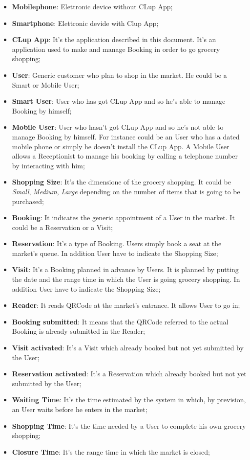 \begin{itemize}

\item \textbf{Mobilephone}: Elettronic device without CLup App;
\item \textbf{Smartphone}: Elettronic devide with Clup App; 
\item \textbf{CLup App}: It's the application described in this document. It's an application used to make and manage Booking in order to go grocery shopping;
\item \textbf{User}: Generic customer who plan to shop in the market. He could be a Smart or Mobile User;
\item \textbf{Smart User}: User who has got CLup App and so he's able to manage Booking by himself;
\item \textbf{Mobile User}: User who hasn't got CLup App and so he's not able to manage Booking by himself. For instance could be an User who has a dated mobile phone or simply he doesn't install the CLup App. A Mobile User allows a Receptionist to manage his booking by calling a telephone number by interacting with him;
\item \textbf{Shopping Size}: It's the dimensione of the grocery shopping. It could be \textit{Small}, \textit{Medium}, \textit{Large} depending on the number of items that is going to be purchased;  %
\item \textbf{Booking}: It indicates the generic appointment of a User in the market. It could be a Reservation or a Visit;
\item \textbf{Reservation}: It's a type of Booking. Users simply book a seat at the market's queue. In addition User have to indicate the Shopping Size; 
\item \textbf{Visit}: It's a Booking planned in advance by Users. It is planned by putting the date and the range time in which the User is going grocery shopping. In addition User have to indicate the Shopping Size; 
\item \textbf{Reader}: It reads QRCode at the market's entrance. It allows User to go in;
\item \textbf{Booking submitted}: It means that the QRCode referred to the actual Booking is already submitted in the Reader;
\item \textbf{Visit activated}: It's a Visit which already booked but not yet submitted by the User;
\item \textbf{Reservation activated}: It's a Reservation which already booked but not yet submitted by the User;
\item \textbf{Waiting Time}: It's the time estimated by the system in which, by prevision, an User waits before he enters in the market;
\item \textbf{Shopping Time}: It's the time needed by a User to complete his own grocery shopping;
\item \textbf{Closure Time}: It's the range time in which the market is closed;
\end{itemize}

